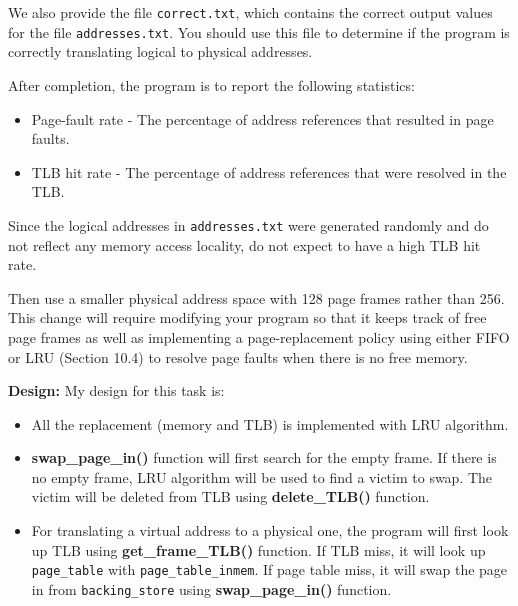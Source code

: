 \documentclass[UTF8,10pt,a4paper]{article}
\theoremstyle{Problem}
\theoremstyle{Solution}
\begin{document}
We also provide the file \texttt{correct.txt}, which contains the correct output values for the file \texttt{addresses.txt}. You should use this file to determine if the program is correctly translating logical to physical addresses.

After completion, the program is to report the following statistics:
\begin{itemize}
  \item Page-fault rate - The percentage of address references that resulted in page faults.
  \item TLB hit rate - The percentage of address references that were resolved in the TLB.
\end{itemize}

Since the logical addresses in \texttt{addresses.txt} were generated randomly and do not reflect any memory access locality, do not expect to have a high TLB hit rate.

Then use a smaller physical address space with 128 page frames rather than 256. This change will require modifying your program so that it keeps track of free page frames as well as implementing a page-replacement policy using either FIFO or LRU (Section 10.4) to resolve page faults when there is no free memory.



\textbf{Design:} My design for this task is:
\begin{itemize}
    \item All the replacement (memory and TLB) is implemented with LRU algorithm.
    \item \textbf{swap\_page\_in()} function will first search for the empty frame. If there is no empty frame, LRU algorithm will be used to find a victim to swap. The victim will be deleted from TLB using \textbf{delete\_TLB()} function.
    \item For translating a virtual address to a physical one, the program will first look up TLB using \textbf{get\_frame\_TLB()} function. If TLB miss, it will look up \texttt{page\_table} with \texttt{page\_table\_inmem}. If page table miss, it will swap the page in from \texttt{backing\_store} using \textbf{swap\_page\_in()} function.
\end{itemize}
\end{document}
